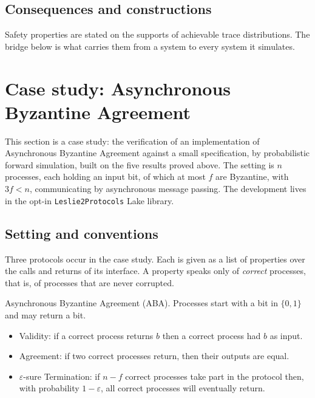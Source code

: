 \subsection{Consequences and constructions}

Safety properties are stated on the supports of achievable trace distributions.
The bridge below is what carries them from a system to every system it simulates.























\section{Case study: Asynchronous Byzantine Agreement}

This section is a case study: the verification of an implementation of
Asynchronous Byzantine Agreement against a small specification, by
probabilistic forward simulation, built on the five results proved above.
The setting is $n$ processes, each holding an input bit, of which at most $f$
are Byzantine, with $3f < n$, communicating by asynchronous message passing.
The development lives in the opt-in \texttt{Leslie2Protocols} Lake library.

\subsection{Setting and conventions}

Three protocols occur in the case study.
Each is given as a list of properties over the calls and returns of its
interface.
A property speaks only of \emph{correct} processes, that is, of processes
that are never corrupted.

Asynchronous Byzantine Agreement (ABA).
Processes start with a bit in $\{0,1\}$ and may return a bit.
\begin{itemize}
  \item Validity: if a correct process returns $b$ then a correct process had
    $b$ as input.
  \item Agreement: if two correct processes return, then their outputs are
    equal.
  \item $\varepsilon$-sure Termination: if $n-f$ correct processes take part in
    the protocol then, with probability $1-\varepsilon$, all correct processes
    will eventually return.
\end{itemize}

